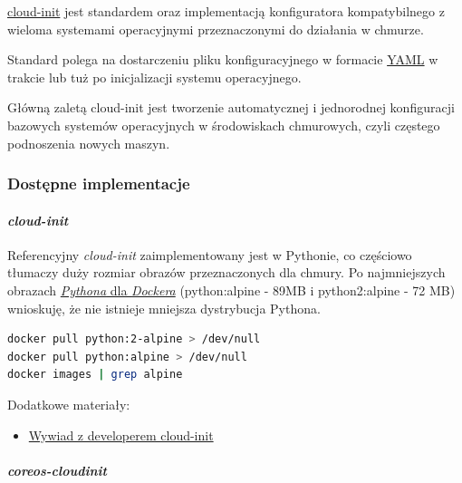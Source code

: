 \documentclass[a4paper,12pt,twoside,openany]{report}
\providecommand{\tightlist}{%
  \setlength{\itemsep}{0pt}\setlength{\parskip}{0pt}}
\begin{document}
\href{https://cloud-init.io/}{cloud-init} jest standardem oraz
implementacją konfiguratora kompatybilnego z wieloma systemami
operacyjnymi przeznaczonymi do działania w chmurze.

Standard polega na dostarczeniu pliku konfiguracyjnego w formacie
\href{http://yaml.org/}{YAML} w trakcie lub tuż po inicjalizacji systemu
operacyjnego.

Główną zaletą cloud-init jest tworzenie automatycznej i jednorodnej
konfiguracji bazowych systemów operacyjnych w środowiskach chmurowych,
czyli częstego podnoszenia nowych maszyn.

\hypertarget{dostux119pne-implementacje}{%
\subsubsection{Dostępne
implementacje}\label{dostux119pne-implementacje}}

\hypertarget{cloud-init}{%
\paragraph{\texorpdfstring{\emph{cloud-init}}{cloud-init}}\label{cloud-init}}

Referencyjny \emph{cloud-init} zaimplementowany jest w Pythonie, co
częściowo tłumaczy duży rozmiar obrazów przeznaczonych dla chmury. Po
najmniejszych obrazach
\href{https://hub.docker.com/_/python/}{\emph{Pythona} dla
\emph{Dockera}} (python:alpine - 89MB i python2:alpine - 72 MB)
wnioskuję, że nie istnieje mniejsza dystrybucja Pythona.

\begin{lstlisting}[language=bash]
docker pull python:2-alpine > /dev/null
docker pull python:alpine > /dev/null
docker images | grep alpine
\end{lstlisting}

Dodatkowe materiały:

\begin{itemize}
\tightlist
\item
  \href{https://www.podcastinit.com/cloud-init-with-scott-moser-episode-126}{Wywiad
  z developerem cloud-init}
\end{itemize}

\hypertarget{coreos-cloudinit}{%
\paragraph{\texorpdfstring{\emph{coreos-cloudinit}}{coreos-cloudinit}}\label{coreos-cloudinit}}
\end{document}
